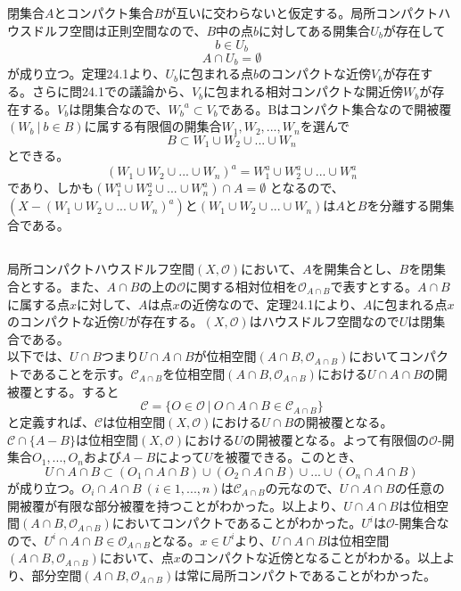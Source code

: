 \documentclass{jsarticle}
\begin{document}
\subsection{}
閉集合$A$とコンパクト集合$B$が互いに交わらないと仮定する。局所コンパクトハウスドルフ空間は正則空間なので、$B$中の点$b$に対してある開集合$U_b$が存在して
\[b\in U_b\]
\[A\cap U_b=\emptyset\]
が成り立つ。定理24.1より、$U_b$に包まれる点$b$のコンパクトな近傍$V_b$が存在する。さらに問24.1での議論から、$V_b$に包まれる相対コンパクトな開近傍$W_b$が存在する。$V_b$は閉集合なので、${W_b}^a\subset V_b$である。Bはコンパクト集合なので開被覆$(W_b\ |\ b\in B)$に属する有限個の開集合$W_1,W_2,...,W_n$を選んで
\[B\subset W_1\cup W_2\cup...\cup W_n\]
とできる。
\[(W_1\cup W_2\cup...\cup W_n)^a=W_1^a\cup W_2^a\cup...\cup W_n^a\]
であり、しかも$(W_1^a\cup W_2^a\cup...\cup W_n^a)\cap A=\emptyset$
となるので、$(X-(W_1\cup W_2\cup...\cup W_n)^a)$と$(W_1\cup W_2\cup...\cup W_n)$は$A$と$B$を分離する開集合である。


\subsection{}
局所コンパクトハウスドルフ空間$(X,\mathcal{O})$において、$A$を開集合とし、$B$を閉集合とする。また、$A\cap B$の上の$\mathcal{O}$に関する相対位相を$\mathcal{O}_{A\cap B}$で表すとする。$A\cap B$に属する点$x$に対して、$A$は点$x$の近傍なので、定理24.1により、$A$に包まれる点$x$のコンパクトな近傍$U$が存在する。$(X,\mathcal{O})$はハウスドルフ空間なので$U$は閉集合である。\\
以下では、$U\cap B$つまり$U\cap A\cap B$が位相空間$(A\cap B,\mathcal{O}_{A\cap B})$においてコンパクトであることを示す。$\mathcal{C}_{A\cap B}$を位相空間$(A\cap B, \mathcal{O}_{A\cap B})$における$U\cap A\cap B$の開被覆とする。すると
\[\mathcal{C}=\{O\in\mathcal{O}\ |\ O\cap A\cap B\in\mathcal{C}_{A\cap B}\}\]
と定義すれば、$\mathcal{C}$は位相空間$(X,\mathcal{O})$における$U\cap B$の開被覆となる。$\mathcal{C}\cap\{A-B\}$は位相空間$(X,\mathcal{O})$における$U$の開被覆となる。よって有限個の$\mathcal{O}$-開集合$O_1,...,O_n$および$A-B$によって$U$を被覆できる。このとき、
\[U\cap A\cap B\subset (O_1\cap A\cap B)\cup( O_2\cap A\cap B)\cup...\cup (O_n\cap A\cap B)\]
が成り立つ。$O_i\cap A\cap B\ (i\in {1,...,n})$は$\mathcal{C}_{A\cap B}$の元なので、$U\cap A\cap B$の任意の開被覆が有限な部分被覆を持つことがわかった。以上より、$U\cap A\cap B$は位相空間$(A\cap B,\mathcal{O}_{A\cap B})$においてコンパクトであることがわかった。$U^i$は$\mathcal{O}$-開集合なので、$U^i\cap A\cap B\in\mathcal{O}_{A\cap B}$となる。$x\in U^i$より、$U\cap A\cap B$は位相空間$(A\cap B,\mathcal{O}_{A\cap B})$において、点$x$のコンパクトな近傍となることがわかる。以上より、部分空間$(A\cap B,\mathcal{O}_{A\cap B})$は常に局所コンパクトであることがわかった。
\end{document}
